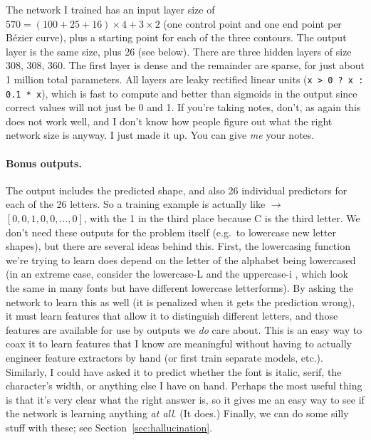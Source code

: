 \documentclass[twocolumn]{article}
\begin{document}
The network I trained has an input layer size of $570 = (100 + 25 + 16)
\times 4 + 3 \times 2$ (one control point and one end point per
B\'ezier curve), plus a starting point for each of the three contours.
The output layer is the same size, plus 26 (see below). There are
three hidden layers of size 308, 308, 360. The first layer is dense
and the remainder are sparse,
for just about 1 million total parameters. All layers are leaky
rectified linear units ({\tt x > 0 ? x : 0.1 * x}), which is fast to
compute and better than sigmoids in the output since correct values
will not just be 0 and 1. If you're taking notes, don't, as again this
does not work well, and I don't know how people figure out what the
right network size is anyway. I just made it up. You can give {\em me}
your notes.

\paragraph{Bonus outputs.} The output includes the predicted shape,
and also 26 individual predictors for each of the 26 letters. So a
training example is actually like  $\rightarrow$
 $[0, 0, 1, 0, 0, \ldots, 0]$, with the 1 in the third
place because C is the third letter. We don't need these outputs for
the problem itself (e.g.~to lowercase new letter shapes), but there
are several ideas behind this. First, the lowercasing function we're
trying to learn does depend on the letter of the alphabet being
lowercased (in an extreme case, consider the lowercase-L
 and the uppercase-i , which look the same
in many fonts but have different lowercase letterforms). By asking the
network to learn this as well (it is penalized when it gets the
prediction wrong), it must learn features that allow it to distinguish
different letters, and those features are available for use by outputs
we {\em do} care about. This is an easy way to coax it to learn
features that I know are meaningful without having to actually
engineer feature extractors by hand (or first train separate models,
etc.). Similarly, I could have asked it to predict whether the font
is italic, serif, the character's width, or anything else I have on
hand. Perhaps the most useful thing is that it's very clear what the
right answer is, so it gives me an easy way to see if the network is
learning anything {\em at all}. (It does.) Finally, we can do some
silly stuff with these; see Section~\ref{sec:hallucination}.
\end{document}
